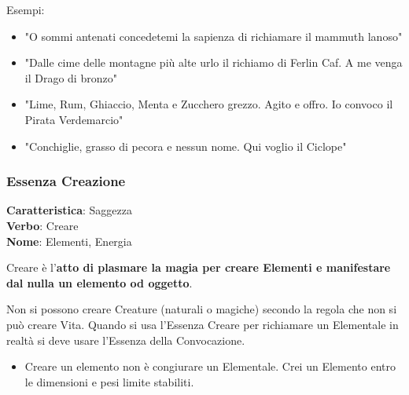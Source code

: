 \documentclass[a4paper,10 pt,twoside,openany]{book}
\begin{document}
\bigskip

Esempi:
\begin{itemize}
	\item
	"O sommi antenati concedetemi la sapienza di richiamare il mammuth lanoso"
	\item
	"Dalle cime delle montagne più alte urlo il richiamo di Ferlin Caf. A me venga il Drago di bronzo"
	\item
	"Lime, Rum, Ghiaccio, Menta e Zucchero grezzo. Agito e offro. Io convoco il Pirata Verdemarcio"
	\item
	"Conchiglie, grasso di pecora e nessun nome. Qui voglio il Ciclope"
\end{itemize}

\pagebreak

\subsubsection{Essenza Creazione}

\textbf{Caratteristica}: Saggezza\\
\textbf{Verbo}: Creare\\
\textbf{Nome}: Elementi, Energia\\


\label{essenza-creazione---volonta}

Creare è l'\textbf{atto di plasmare la magia per creare Elementi e manifestare dal nulla un elemento od oggetto}.

Non si possono creare Creature (naturali o magiche) secondo la regola che non si può creare Vita. Quando si usa l'Essenza Creare per richiamare un Elementale in realtà si deve usare l'Essenza della Convocazione.

\begin{itemize}
	\item Creare un elemento non è congiurare un Elementale. Crei un Elemento entro le dimensioni e pesi limite stabiliti.
\end{itemize}
\end{document}
